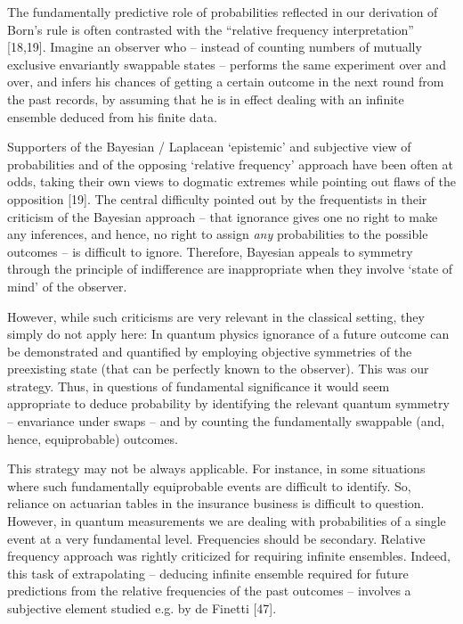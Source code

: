 \documentclass[aps,twocolumn,pra,epsfig]{revtex4}
\begin{document}
The fundamentally predictive role of probabilities reflected in our
derivation of Born's rule is often contrasted with the ``relative frequency
interpretation'' [18,19]. Imagine an observer who -- instead of counting
numbers of mutually exclusive envariantly swappable states -- performs
the same experiment over and over, and infers his chances of getting a certain
outcome in the next round from the past records, by assuming that he is in
effect dealing with an infinite ensemble deduced from his finite data.

Supporters of the Bayesian / Laplacean `epistemic'  and subjective view 
of probabilities and of the opposing `relative frequency' approach have
been often at odds, taking their own views to dogmatic extremes while
pointing out flaws of the opposition [19]. The central difficulty pointed out
by the frequentists in their criticism of the Bayesian approach -- that
ignorance gives one no right to make any inferences, and hence, no
right to assign {\it any} probabilities to the possible outcomes -- is difficult
to ignore. Therefore, Bayesian appeals to symmetry through the principle 
of indifference are inappropriate when they involve `state of mind' of the observer. 

However, while such criticisms are very relevant in the classical setting, they
simply do not apply here: In quantum physics ignorance of a future outcome 
can be demonstrated and quantified by employing objective symmetries of
the preexisting state (that can be perfectly known to the observer). This was 
our strategy. Thus, in questions of fundamental significance it would seem 
appropriate to deduce probability by identifying the relevant quantum symmetry --
envariance under swaps -- and by counting the fundamentally swappable (and,
hence, equiprobable) outcomes. 

This strategy may not be always applicable. For instance, in some
situations where such fundamentally equiprobable events are difficult
to identify. So, reliance on actuarian tables in the insurance business is 
difficult to question. However, in quantum measurements we are dealing 
with probabilities of a single event at a very fundamental level. Frequencies 
should be secondary. Relative frequency approach was rightly criticized for 
requiring infinite ensembles. Indeed, this task of extrapolating -- deducing infinite 
ensemble required for future predictions from the relative frequencies of the past
outcomes -- involves a subjective element studied e.g. by de Finetti [47].
\end{document}
